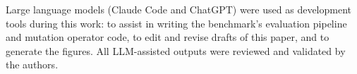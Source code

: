 \documentclass[sigconf,anonymous,review]{acmart}
\begin{document}
\begin{acks}
Large language models (Claude Code and ChatGPT) were used as development tools during this work: to assist in writing the benchmark's evaluation pipeline and mutation operator code, to edit and revise drafts of this paper, and to generate the figures. All LLM-assisted outputs were reviewed and validated by the authors.
\end{acks}





\appendix
\end{document}

